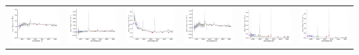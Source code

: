 \begin{center}
\begin{longtable}{l l l l l l }
    \includegraphics[width=0.3\linewidth, clip]{Figs/Figs-sdss/spec-4377-55828-0912-SPLUS-s02s07-022389.pdf} & \includegraphics[width=0.3\linewidth, clip]{Figs/Figs-sdss/spec-4380-55857-0774-SPLUS-s02s10-002532.pdf} & \includegraphics[width=0.3\linewidth, clip]{Figs/Figs-sdss/spec-4740-55651-0188-SPLUS-n02n18-039610.pdf} & \includegraphics[width=0.3\linewidth, clip]{Figs/Figs-sdss/spec-4778-55706-0848-SPLUS-n05n55-008444.pdf} & \includegraphics[width=0.3\linewidth, clip]{Figs/Figs-sdss/spec-4781-55653-0846-SPLUS-n05n50-021799.pdf} & \includegraphics[width=0.3\linewidth, clip]{Figs/Figs-sdss/spec-6780-56267-0244-STRIPE82-0053-009665.pdf} \\

\end{longtable}
\end{center}
